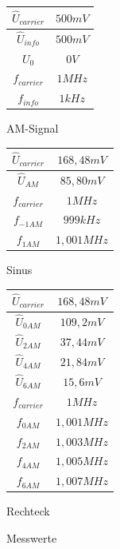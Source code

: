 \begin{figure}[H]
 \begin{minipage}[c]{.3\textwidth}
 \centering
  \begin{tabular}{c|c}
   $\hat{U}_{carrier}$ & $500mV$ \\ \hline
   $\hat{U}_{info}$ & $500mV$ \\ \hline
   $U_0$ & $0V$ \\ \hline
   $f_{carrier}$ & $1MHz$ \\ \hline
   $f_{info}$ & $1kHz$ \\ \hline
  \end{tabular}
  \caption{AM-Signal}
 \end{minipage}
 \begin{minipage}[c]{.3\textwidth}
 \centering
  \begin{tabular}{c|c}
   $\hat{U}_{carrier}$ & $168,48mV$ \\ \hline
   $\hat{U}_{AM}$ & $85,80mV$ \\ \hline
   $f_{carrier}$ & $1MHz$ \\ \hline
   $f_{-1AM}$ & $999kHz$ \\ \hline
   $f_{1AM}$ & $1,001MHz$ \\ \hline
  \end{tabular}
  \caption{Sinus}
 \end{minipage}
 \begin{minipage}[c]{.3\textwidth}
 \centering
  \begin{tabular}{c|c}
   $\hat{U}_{carrier}$ & $168,48mV$ \\ \hline
   $\hat{U}_{0AM}$ & $109,2mV$ \\ \hline
   $\hat{U}_{2AM}$ & $37,44mV$ \\ \hline
   $\hat{U}_{4AM}$ & $21,84mV$ \\ \hline
   $\hat{U}_{6AM}$ & $15,6mV$ \\ \hline
   $f_{carrier}$ & $1MHz$ \\ \hline
   $f_{0AM}$ & $1,001MHz$ \\ \hline
   $f_{2AM}$ & $1,003MHz$ \\ \hline
   $f_{4AM}$ & $1,005MHz$ \\ \hline
   $f_{6AM}$ & $1,007MHz$ \\ \hline
  \end{tabular}
  \caption{Rechteck}
 \end{minipage}
 \caption{Messwerte}
\end{figure}

